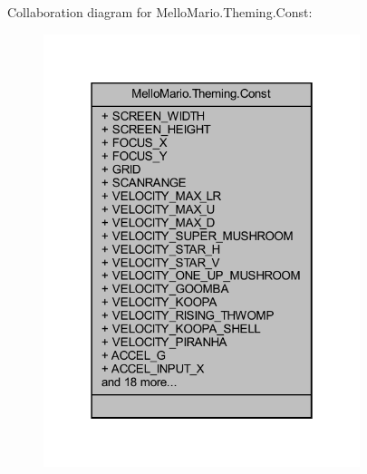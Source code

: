 Collaboration diagram for Mello\+Mario.\+Theming.\+Const\+:
\nopagebreak
\begin{figure}[H]
\begin{center}
\leavevmode
\includegraphics[width=262pt]{classMelloMario_1_1Theming_1_1Const__coll__graph}
\end{center}
\end{figure}
